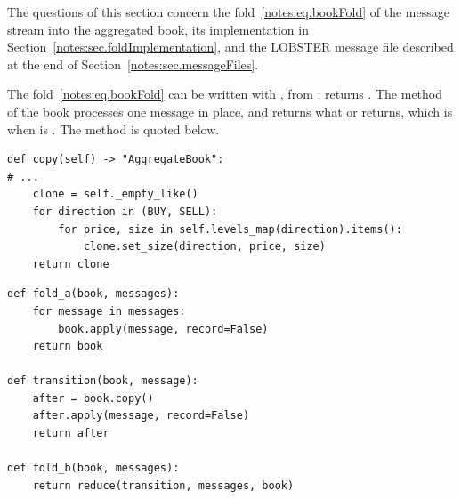 The questions of this section concern the fold~\eqref{notes:eq.bookFold} of the message stream
into the aggregated book,
its implementation in Section~\ref{notes:sec.foldImplementation},
and the LOBSTER message file described at the end of Section~\ref{notes:sec.messageFiles}.

\begin{question}
\label{question.foldByReduceOverApply}
The fold~\eqref{notes:eq.bookFold} can be written with , from :
 returns .
The method  of the book processes one message in place,
and returns what  or  returns,
which is  when  is .
The method  is quoted below.
\begin{lstlisting}[caption={\protect\codehl{unito26.lob.orderbook.AggregateBook.copy}, its docstring elided.}, label=listing.foldByReduceOverApplyCopy]
def copy(self) -> "AggregateBook":
# ...
    clone = self._empty_like()
    for direction in (BUY, SELL):
        for price, size in self.levels_map(direction).items():
            clone.set_size(direction, price, size)
    return clone
\end{lstlisting}
\begin{lstlisting}[caption={Three folds}, label=listing.foldByReduceOverApplyFolds]
def fold_a(book, messages):
    for message in messages:
        book.apply(message, record=False)
    return book

def transition(book, message):
    after = book.copy()
    after.apply(message, record=False)
    return after

def fold_b(book, messages):
    return reduce(transition, messages, book)


\end{lstlisting}
\end{question}
